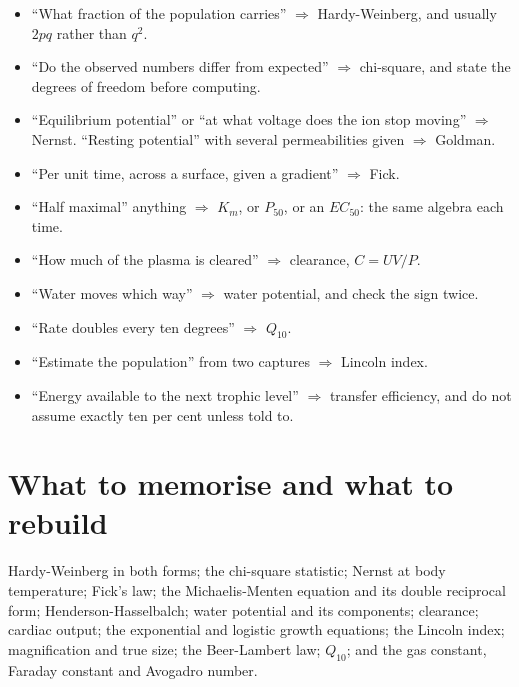 \begin{keybox}[title={The wording-to-equation key}]
\begin{itemize}
\item ``What fraction of the population carries'' $\Rightarrow$ Hardy-Weinberg, and
      usually $2pq$ rather than $q^2$.
\item ``Do the observed numbers differ from expected'' $\Rightarrow$ chi-square, and
      state the degrees of freedom before computing.
\item ``Equilibrium potential'' or ``at what voltage does the ion stop moving''
      $\Rightarrow$ Nernst. ``Resting potential'' with several permeabilities given
      $\Rightarrow$ Goldman.
\item ``Per unit time, across a surface, given a gradient'' $\Rightarrow$ Fick.
\item ``Half maximal'' anything $\Rightarrow$ $K_m$, or $P_{50}$, or an $EC_{50}$: the
      same algebra each time.
\item ``How much of the plasma is cleared'' $\Rightarrow$ clearance, $C=UV/P$.
\item ``Water moves which way'' $\Rightarrow$ water potential, and check the sign twice.
\item ``Rate doubles every ten degrees'' $\Rightarrow$ $Q_{10}$.
\item ``Estimate the population'' from two captures $\Rightarrow$ Lincoln index.
\item ``Energy available to the next trophic level'' $\Rightarrow$ transfer efficiency,
      and do not assume exactly ten per cent unless told to.
\end{itemize}
\end{keybox}

\section{What to memorise and what to rebuild}

\begin{keybox}[title={Memorise these outright}]
Hardy-Weinberg in both forms; the chi-square statistic; Nernst at body temperature;
Fick's law; the Michaelis-Menten equation and its double reciprocal form;
Henderson-Hasselbalch; water potential and its components; clearance; cardiac output;
the exponential and logistic growth equations; the Lincoln index; magnification and true
size; the Beer-Lambert law; $Q_{10}$; and the gas constant, Faraday constant and
Avogadro number.
\end{keybox}

